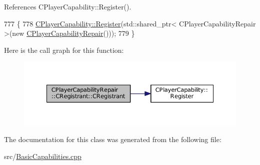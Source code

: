 References C\+Player\+Capability\+::\+Register().


\begin{DoxyCode}
777                                                \{
778     \hyperlink{classCPlayerCapability_a7e298018dcde2684451add3cfff065f7}{CPlayerCapability::Register}(std::shared\_ptr< CPlayerCapabilityRepair >(\textcolor{keyword}{new} 
      \hyperlink{classCPlayerCapabilityRepair_a1c11519a127c65cd5b5ead8d9537c240}{CPlayerCapabilityRepair}()));   
779 \}
\end{DoxyCode}
Here is the call graph for this function\+:\nopagebreak
\begin{figure}[H]
\begin{center}
\leavevmode
\includegraphics[width=350pt]{classCPlayerCapabilityRepair_1_1CRegistrant_aeffe332a2dd871a9c29f6d1fa780f473_cgraph}
\end{center}
\end{figure}


The documentation for this class was generated from the following file\+:\begin{DoxyCompactItemize}
\item 
src/\hyperlink{BasicCapabilities_8cpp}{Basic\+Capabilities.\+cpp}\end{DoxyCompactItemize}
